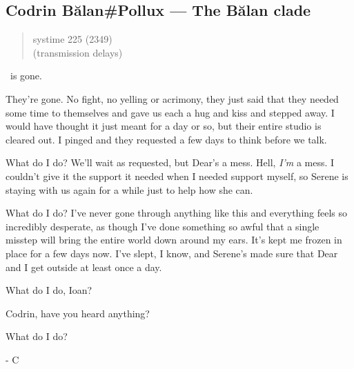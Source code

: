 \hypertarget{codrin-bux103lanpollux-the-bux103lan-clade}{%
\subsection{Codrin Bălan\#Pollux — The Bălan clade}\label{codrin-bux103lanpollux-the-bux103lan-clade}}

\begin{quote}
systime 225 (2349)\\
(transmission delays)
\end{quote}

\Partner\ is gone.

They're gone. No fight, no yelling or acrimony, they just said that they needed some time to themselves and gave us each a hug and kiss and stepped away. I would have thought it just meant for a day or so, but their entire studio is cleared out. I pinged and they requested a few days to think before we talk.

What do I do? We'll wait as requested, but Dear's a mess. Hell, \emph{I'm} a mess. I couldn't give it the support it needed when I needed support myself, so Serene is staying with us again for a while just to help how she can.

What do I do? I've never gone through anything like this and everything feels so incredibly desperate, as though I've done something so awful that a single misstep will bring the entire world down around my ears. It's kept me frozen in place for a few days now. I've slept, I know, and Serene's made sure that Dear and I get outside at least once a day.

What do I do, Ioan?

Codrin, have you heard anything?

What do I do?

- C
